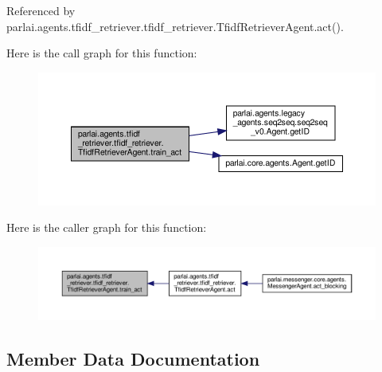 


Referenced by parlai.\+agents.\+tfidf\+\_\+retriever.\+tfidf\+\_\+retriever.\+Tfidf\+Retriever\+Agent.\+act().

Here is the call graph for this function\+:
\nopagebreak
\begin{figure}[H]
\begin{center}
\leavevmode
\includegraphics[width=350pt]{classparlai_1_1agents_1_1tfidf__retriever_1_1tfidf__retriever_1_1TfidfRetrieverAgent_a424c899b5755606c32c7d6a85989ce92_cgraph}
\end{center}
\end{figure}
Here is the caller graph for this function\+:
\nopagebreak
\begin{figure}[H]
\begin{center}
\leavevmode
\includegraphics[width=350pt]{classparlai_1_1agents_1_1tfidf__retriever_1_1tfidf__retriever_1_1TfidfRetrieverAgent_a424c899b5755606c32c7d6a85989ce92_icgraph}
\end{center}
\end{figure}


\subsection{Member Data Documentation}
\mbox{\label{classparlai_1_1agents_1_1tfidf__retriever_1_1tfidf__retriever_1_1TfidfRetrieverAgent_a452d71ce3d6e2a52d37d8f305c6ffc2a}} 
